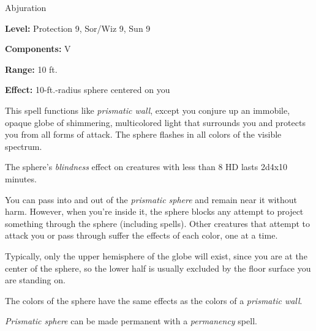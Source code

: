 
Abjuration

\textbf{Level:} Protection 9, Sor/Wiz 9, Sun 9

\textbf{Components:} V

\textbf{Range:} 10 ft.

\textbf{Effect:} 10-ft.-radius sphere centered on you

This spell functions like \textit{prismatic wall}, except you conjure up an immobile, 
opaque globe of shimmering, multicolored light that surrounds you and protects 
you from all forms of attack. The sphere flashes in all colors of the visible spectrum. 

The sphere's \textit{blindness} effect on creatures with less than 8 HD lasts 2d4x10 
minutes.

You can pass into and out of the \textit{prismatic sphere} and remain near it without 
harm. However, when you're inside it, the sphere blocks any attempt to project 
something through the sphere (including spells). Other creatures that attempt to 
attack you or pass through suffer the effects of each color, one at a time.

Typically, only the upper hemisphere of the globe will exist, since you are at 
the center of the sphere, so the lower half is usually excluded by the floor surface 
you are standing on.

The colors of the sphere have the same effects as the colors of a \textit{prismatic 
wall}.

\textit{Prismatic sphere} can be made permanent with a \textit{permanency} spell.

